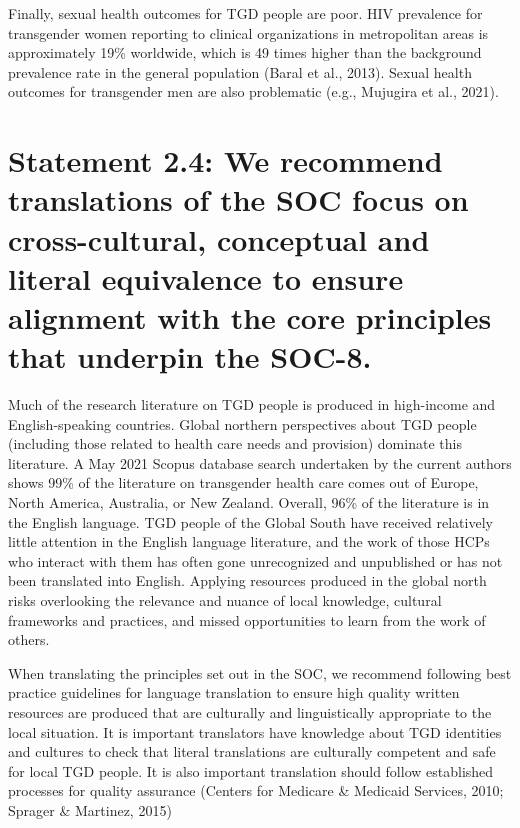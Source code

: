 \documentclass[
]{book}
\begin{document}
Finally, sexual health outcomes for TGD people
are poor. HIV prevalence for transgender women
reporting to clinical organizations in metropolitan
areas is approximately 19\% worldwide, which is
49 times higher than the background prevalence
rate in the general population (Baral et al., 2013).
Sexual health outcomes for transgender men are
also problematic (e.g., Mujugira et al., 2021).

\hypertarget{statement-2.4-we-recommend-translations-of-the-soc-focus-on-cross-cultural-conceptual-and-literal-equivalence-to-ensure-alignment-with-the-core-principles-that-underpin-the-soc-8.}{%
\section*{Statement 2.4: We recommend translations of the SOC focus on cross-cultural, conceptual and literal equivalence to ensure alignment with the core principles that underpin the SOC-8.}\label{statement-2.4-we-recommend-translations-of-the-soc-focus-on-cross-cultural-conceptual-and-literal-equivalence-to-ensure-alignment-with-the-core-principles-that-underpin-the-soc-8.}}

Much of the research literature on TGD people
is produced in high-income and English-speaking
countries. Global northern perspectives about
TGD people (including those related to health
care needs and provision) dominate this literature. A May 2021 Scopus database search undertaken by the current authors shows 99\% of the
literature on transgender health care comes out
of Europe, North America, Australia, or New
Zealand. Overall, 96\% of the literature is in the
English language. TGD people of the Global
South have received relatively little attention in
the English language literature, and the work of
those HCPs who interact with them has often
gone unrecognized and unpublished or has not
been translated into English. Applying resources
produced in the global north risks overlooking
the relevance and nuance of local knowledge,
cultural frameworks and practices, and missed
opportunities to learn from the work of others.

When translating the principles set out in the
SOC, we recommend following best practice
guidelines for language translation to ensure high
quality written resources are produced that are
culturally and linguistically appropriate to the local
situation. It is important translators have knowledge about TGD identities and cultures to check
that literal translations are culturally competent
and safe for local TGD people. It is also important
translation should follow established processes for
quality assurance (Centers for Medicare \& Medicaid
Services, 2010; Sprager \& Martinez, 2015)
\end{document}
